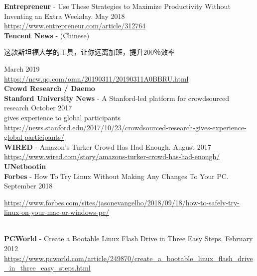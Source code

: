 \vspace{-4mm}

\textbf{Entrepreneur} - Use These Strategies to Maximize Productivity Without Inventing an Extra Weekday. \hfill May 2018\\
\url{https://www.entrepreneur.com/article/312764}\\



\textbf{Tencent News} - (Chinese) \begin{CJK*}{UTF8}{gbsn}这款斯坦福大学的工具，让你远离加班，提升200％效率\end{CJK*} \hfill March 2019\\
\url{https://new.qq.com/omn/20190311/20190311A0BBRU.html}\\


\textcolor{sectcol}{\textbf{Crowd Research / Daemo}}\\

\textbf{Stanford University News} - A Stanford-led platform for crowdsourced research \hfill October 2017\\
gives experience to global participants\\
\url{https://news.stanford.edu/2017/10/23/crowdsourced-research-gives-experience-global-participants/}\\

\textbf{WIRED} - Amazon's Turker Crowd Has Had Enough. \hfill August 2017\\
\url{https://www.wired.com/story/amazons-turker-crowd-has-had-enough/}\\

\textcolor{sectcol}{\textbf{UNetbootin}}\\

\textbf{Forbes} - How To Try Linux Without Making Any Changes To Your PC. \hfill September 2018\\
\begin{small}
\url{https://www.forbes.com/sites/jasonevangelho/2018/09/18/how-to-safely-try-linux-on-your-mac-or-windows-pc/}
\end{small}\\

\textbf{PCWorld} - Create a Bootable Linux Flash Drive in Three Easy Steps. \hfill February 2012\\
\url{https://www.pcworld.com/article/249870/create_a_bootable_linux_flash_drive_in_three_easy_steps.html}\\

